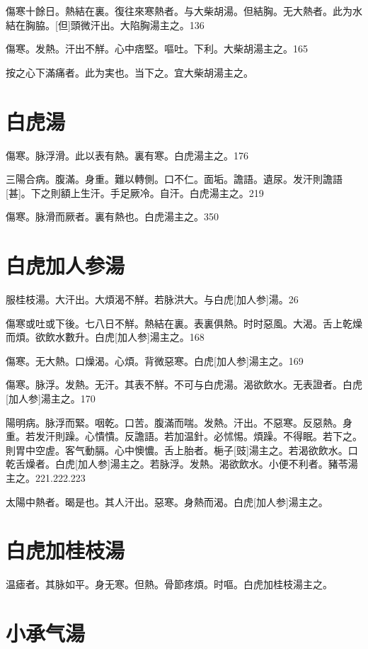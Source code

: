 \documentclass[12pt,twoside,UTF8,b5paper]{ctexbook}
\begin{document}
傷寒十餘日。熱結在裏。復往來寒熱者。与大柴胡湯。但結胸。无大熱者。此为水結在胸脇。[但]頭微汗出。大陷胸湯主之。136

傷寒。发熱。汗出不觧。心中痞堅。嘔吐。下利。大柴胡湯主之。165

按之心下滿痛者。此为実也。当下之。宜大柴胡湯主之。

\section{白虎湯}

傷寒。脉浮滑。此以表有熱。裏有寒。白虎湯主之。176

三陽合病。腹滿。身重。難以轉側。口不仁。面垢。譫語。遺尿。发汗則譫語[甚]。下之則額上生汗。手足厥冷。自汗。白虎湯主之。219

傷寒。脉滑而厥者。裏有熱也。白虎湯主之。350

\section{白虎加人参湯}

服桂枝湯。大汗出。大煩渴不觧。若脉洪大。与白虎[加人参]湯。26

傷寒或吐或下後。七八日不觧。熱結在裏。表裏俱熱。时时惡風。大渴。舌上乾燥而煩。欲飲水數升。白虎[加人参]湯主之。168

傷寒。无大熱。口燥渴。心煩。背微惡寒。白虎[加人参]湯主之。169

傷寒。脉浮。发熱。无汗。其表不觧。不可与白虎湯。渴欲飲水。无表證者。白虎[加人参]湯主之。170

陽明病。脉浮而緊。咽乾。口苦。腹滿而喘。发熱。汗出。不惡寒。反惡熱。身重。若发汗則躁。心憒憒。反譫語。若加温針。必怵惕。煩躁。不得眠。若下之。則胃中空虗。客气動膈。心中懊憹。舌上胎者。梔子[豉]湯主之。若渴欲飲水。口乾舌燥者。白虎[加人参]湯主之。若脉浮。发熱。渴欲飲水。小便不利者。豬苓湯主之。221.222.223

太陽中熱者。暍是也。其人汗出。惡寒。身熱而渴。白虎[加人参]湯主之。

\section{白虎加桂枝湯}

温瘧者。其脉如平。身无寒。但熱。骨節疼煩。时嘔。白虎加桂枝湯主之。

\section{小承气湯}
\end{document}
